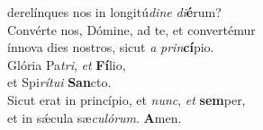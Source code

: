\evenverse derelínques nos in longitú\textit{di}\textit{ne} \textit{di}\textbf{é}rum?\\
\oddverse Convérte nos, Dómine, ad te, et convertémur~\*\\
\oddverse ínnova dies nostros, sicut \textit{a} \textit{prin}\textbf{cí}pio.\\
\evenverse Glória Pa\textit{tri}, \textit{et} \textbf{Fí}lio,~\*\\
\evenverse et Spi\textit{rí}\textit{tu}\textit{i} \textbf{San}cto.\\
\oddverse Sicut erat in princípio, et \textit{nunc}, \textit{et} \textbf{sem}per,~\*\\
\oddverse et in sǽcula sæ\textit{cu}\textit{ló}\textit{rum}. \textbf{A}men.\\
